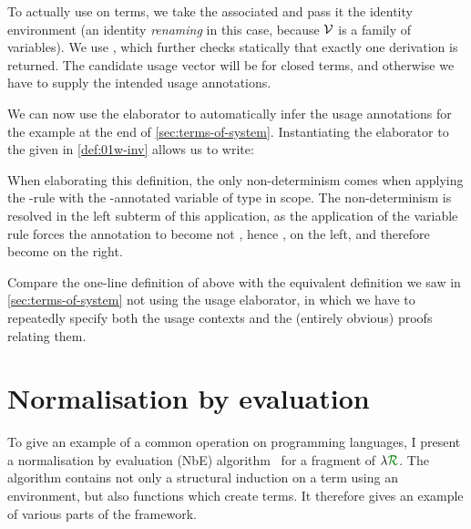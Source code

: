 
To actually use  on terms, we take the associated
 and pass it the identity environment (an identity
\emph{renaming} in this case, because $\mathcal V$ is a family of variables).
We use , which further
checks statically that exactly one derivation is returned.
The candidate usage vector  will be \AgdaFunction{[]} for closed
terms, and otherwise we have to supply the intended usage annotations.

We can now use the elaborator to automatically infer the usage
annotations for the example at the end of \cref{sec:terms-of-system}.
Instantiating the elaborator to the  given in
\cref{def:01w-inv} allows us to write:


When elaborating this definition, the only non-determinism comes when
applying the -rule with the
-annotated variable of type
\AgdaInductiveConstructor{!} \AgdaInductiveConstructor{$\omega$\#} %
 in scope.
The non-determinism is resolved in the left subterm of this application, as the
application of the variable rule forces the annotation to become not
, hence , on the
left, and therefore become  on the right.

Compare the one-line definition of  above with
the equivalent definition we saw in \cref{sec:terms-of-system} not using the
usage elaborator, in which we have to repeatedly specify both the usage contexts
and the (entirely obvious) proofs relating them.




\section{Normalisation by evaluation}\label{sec:nbe}

To give an example of a common operation on programming languages, I present a
normalisation by evaluation (NbE) algorithm~\citep{BS91} for a fragment of
$\name$.
The algorithm contains not only a structural induction on a term using an
environment, but also functions which create terms.
It therefore gives an example of various parts of the framework.

